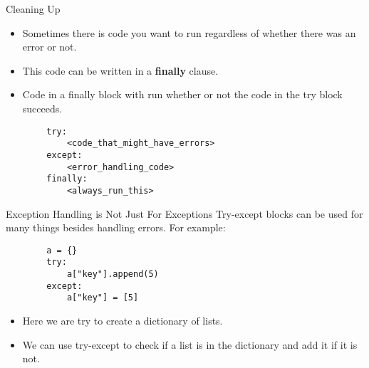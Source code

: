 \documentclass[serif,xcolor=pdftex,dvipsnames,table,hyperref={bookmarks=false,breaklinks}]{beamer}
\begin{document}
\begin{frame}[t,fragile]{Cleaning Up}
	\begin{itemize}[<+->]
		\item Sometimes there is code you want to run regardless of whether there was an error or not.
		\item This code can be written in a \textbf{finally} clause.
		\item Code in a finally block with run whether or not the code in the try block succeeds.
	\end{itemize}
	\pause
	\begin{lstlisting}
		try:
		    <code_that_might_have_errors>
		except:
		    <error_handling_code>
		finally:
		    <always_run_this>
	\end{lstlisting}
\end{frame}

\begin{frame}[t,fragile]{Exception Handling is Not Just For Exceptions}
	Try-except blocks can be used for many things besides handling errors. For example:
	\pause
	\begin{lstlisting}
		a = {}
		try:
		    a["key"].append(5)
		except:
		    a["key"] = [5]
	\end{lstlisting}
	\pause
	\begin{itemize}
		\item Here we are try to create a dictionary of lists.
		\item We can use try-except to check if a list is in the dictionary and add it if it is not.
	\end{itemize}
\end{frame}

%
%
\end{document}
